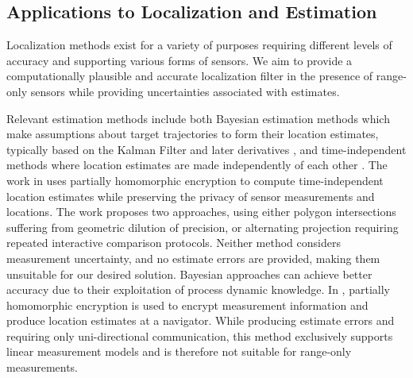 \documentclass[10pt,letterpaper,oneside,twocolumn,journal]{IEEEtran}
\theoremstyle{definition}
\theoremstyle{definition}
\theoremstyle{remark}
\begin{document}
% 
% 

\subsection{Applications to Localization and Estimation}
Localization methods exist for a variety of purposes requiring different levels of accuracy and supporting various forms of sensors. We aim to provide a computationally plausible and accurate localization filter in the presence of range-only sensors while providing uncertainties associated with estimates. 

Relevant estimation methods include both Bayesian estimation methods which make assumptions about target trajectories to form their location estimates, typically based on the Kalman Filter and later derivatives \cite{kalmanNewApproachLinear1960,mutambaraDecentralizedEstimationControl1998}, and time-independent methods where location estimates are made independently of each other \cite{alanwarPrOLocResilientLocalization2017,lazosSeRLocSecureRangeindependent2004}. The work in \cite{alanwarPrOLocResilientLocalization2017} uses partially homomorphic encryption to compute time-independent location estimates while preserving the privacy of sensor measurements and locations. The work proposes two approaches, using either polygon intersections suffering from geometric dilution of precision, or alternating projection requiring repeated interactive comparison protocols. Neither method considers measurement uncertainty, and no estimate errors are provided, making them unsuitable for our desired solution. Bayesian approaches can achieve better accuracy due to their exploitation of process dynamic knowledge. In \cite{aristovEncryptedMultisensorInformation2018}, partially homomorphic encryption is used to encrypt measurement information and produce location estimates at a navigator. While producing estimate errors and requiring only uni-directional communication, this method exclusively supports linear measurement models and is therefore not suitable for range-only measurements. 
\end{document}
